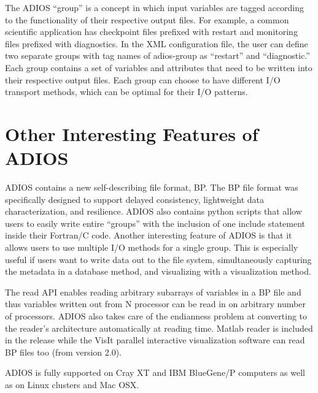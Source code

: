 The ADIOS ``group'' is a concept in which input variables are tagged according 
to the functionality of their respective output files. For example, a common scientific 
application has checkpoint files prefixed with restart and monitoring files prefixed 
with diagnostics. In the XML configuration file, the user can define two separate 
groups with tag names of adios-group as ``restart'' and ``diagnostic.'' Each group 
contains a set of variables and attributes that need to be written into their respective 
output files. Each group can choose to have different I/O transport methods, which 
can be optimal for their I/O patterns.

\section{Other Interesting Features of ADIOS}

ADIOS contains a new self-describing file format, BP. The BP file format was specifically 
designed to support delayed consistency, lightweight data characterization, and 
resilience. ADIOS also contains python scripts that allow users to easily write 
entire ``groups'' with the inclusion of one include statement inside their Fortran/C 
code. Another interesting feature of ADIOS is that it allows users to use multiple 
I/O methods for a single group. This is especially useful if users want to write 
data out to the file system, simultaneously capturing the metadata in a database 
method, and visualizing with a visualization method.

The read API enables reading arbitrary subarrays of variables in a BP file and 
thus variables written out from N processor can be read in on arbitrary number 
of processors. ADIOS also takes care of the endianness problem at converting to 
the reader's architecture automatically at reading time. Matlab reader is included 
in the release while the VisIt parallel interactive visualization software can 
read BP files too (from version 2.0). 

ADIOS is fully supported on Cray XT and IBM BlueGene/P computers as well as on 
Linux clusters and Mac OSX. 

